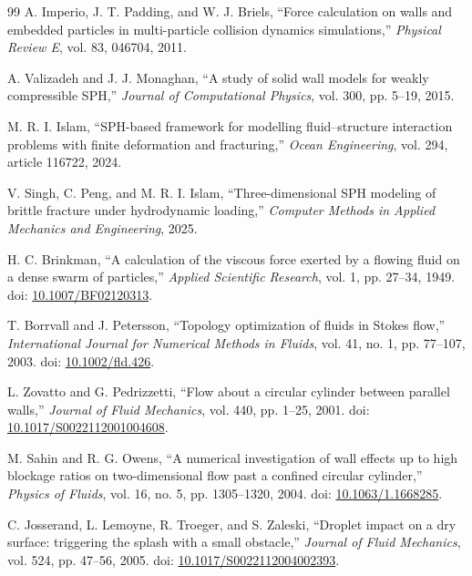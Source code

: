 \documentclass[11pt,a4paper]{article}
\begin{document}
\begin{thebibliography}{99}
A. Imperio, J. T. Padding, and W. J. Briels,
``Force calculation on walls and embedded particles in multi-particle collision dynamics simulations,''
\emph{Physical Review E}, vol. 83, 046704, 2011.

A. Valizadeh and J. J. Monaghan,
``A study of solid wall models for weakly compressible SPH,''
\emph{Journal of Computational Physics}, vol. 300, pp. 5--19, 2015.

M. R. I. Islam,
``SPH-based framework for modelling fluid--structure interaction problems with finite deformation and fracturing,''
\emph{Ocean Engineering}, vol. 294, article 116722, 2024.

V. Singh, C. Peng, and M. R. I. Islam,
``Three-dimensional SPH modeling of brittle fracture under hydrodynamic loading,''
\emph{Computer Methods in Applied Mechanics and Engineering}, 2025.


H. C. Brinkman,
``A calculation of the viscous force exerted by a flowing fluid on a dense swarm of particles,''
\emph{Applied Scientific Research}, vol. 1, pp. 27--34, 1949.
doi: \href{https://doi.org/10.1007/BF02120313}{10.1007/BF02120313}.

T. Borrvall and J. Petersson,
``Topology optimization of fluids in Stokes flow,''
\emph{International Journal for Numerical Methods in Fluids}, vol. 41, no. 1, pp. 77--107, 2003.
doi: \href{https://doi.org/10.1002/fld.426}{10.1002/fld.426}.

L. Zovatto and G. Pedrizzetti,
``Flow about a circular cylinder between parallel walls,''
\emph{Journal of Fluid Mechanics}, vol. 440, pp. 1--25, 2001.
doi: \href{https://doi.org/10.1017/S0022112001004608}{10.1017/S0022112001004608}.

M. Sahin and R. G. Owens,
``A numerical investigation of wall effects up to high blockage ratios on two-dimensional flow past a confined circular cylinder,''
\emph{Physics of Fluids}, vol. 16, no. 5, pp. 1305--1320, 2004.
doi: \href{https://doi.org/10.1063/1.1668285}{10.1063/1.1668285}.


C. Josserand, L. Lemoyne, R. Troeger, and S. Zaleski,
``Droplet impact on a dry surface: triggering the splash with a small obstacle,''
\emph{Journal of Fluid Mechanics}, vol. 524, pp. 47--56, 2005.
doi: \href{https://doi.org/10.1017/S0022112004002393}{10.1017/S0022112004002393}.

\end{thebibliography}
\end{document}
